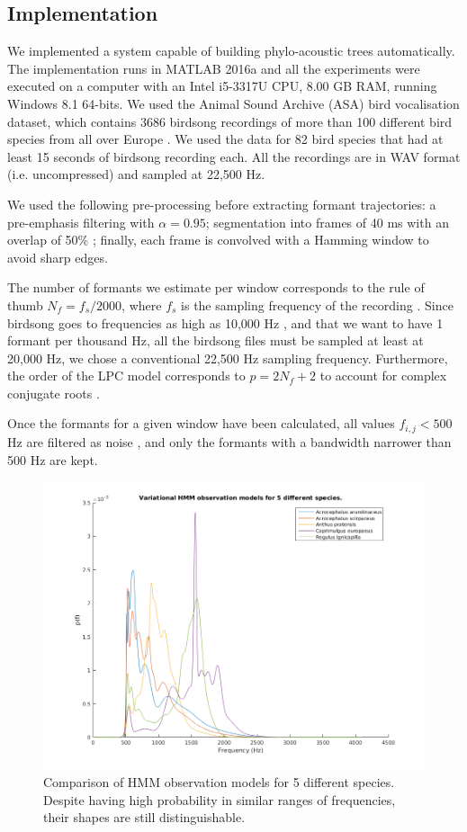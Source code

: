 \documentclass[pdftex,11pt,a4paper]{article}
\theoremstyle{definition}
\theoremstyle{remark}
\begin{document}
\subsection{Implementation}
We implemented a system capable of building phylo-acoustic trees automatically. The implementation runs in MATLAB 2016a and all the experiments were executed on a computer with an Intel i5-3317U CPU, 8.00 GB RAM, running Windows 8.1 64-bits. We used the Animal Sound Archive (ASA) bird vocalisation dataset, which contains 3686 birdsong recordings of more than 100 different bird species from all over Europe \cite{AnimalSoundArchive2015}. We used the data for 82 bird species that had at least 15 seconds of birdsong recording each. All the recordings are in WAV format (i.e. uncompressed) and sampled at 22,500 Hz.
\par We used the following pre-processing before extracting formant trajectories: a pre-emphasis filtering with $\alpha = 0.95$; segmentation into frames of 40 ms with an overlap of 50\% \cite{Stowell2014}; finally, each frame is convolved with a Hamming window to avoid sharp edges. 
\par The number of formants we estimate per window corresponds to the rule of thumb $N_f = f_s / 2000$, where $f_s$ is the sampling frequency of the recording \cite{markel1976}. Since birdsong goes to frequencies as high as 10,000 Hz \cite{Marler2004}, and that we want to have 1 formant per thousand Hz, all the birdsong files must be sampled at least at 20,000 Hz, we chose a conventional 22,500 Hz sampling frequency. Furthermore, the order of the LPC model corresponds to $p = 2N_f + 2$ to account for complex conjugate roots \cite{Benesty}. 
\par Once the formants for a given window have been calculated, all values $f_{i, j} < 500$ Hz are filtered as noise \cite{Stowell2014}, and only the formants with a bandwidth narrower than 500 Hz are kept. 
\begin{figure}[t]
\centering
\includegraphics[width=\textwidth]{images/gmm_plots}
\caption{Comparison of HMM observation models for 5 different species. Despite having high probability in similar ranges of frequencies, their shapes are still distinguishable. }
\label{fig_kdespecies}
\end{figure}
\end{document}
